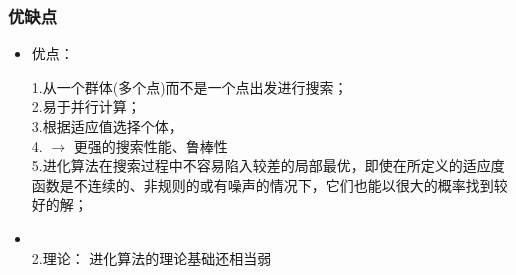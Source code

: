 \documentclass[handout]{beamer}
\begin{document}
		
		
		
		\begin{frame}
			\frametitle{优缺点}
			
			\begin{itemize}
				\item 优点：
				
				1.从一个群体(多个点)而不是一个点出发进行搜索；\\
				2.易于并行计算；\\
				3.根据适应值选择个体， \\
				4.  $\rightarrow$ 更强的搜索性能、鲁棒性\\
				5.进化算法在搜索过程中不容易陷入较差的局部最优，即使在所定义的适应度函数是不连续的、非规则的或有噪声的情况下，它们也能以很大的概率找到较好的解；
				
				
			\end{itemize}
			
	 
			
			\begin{itemize}
				\item {}
				 
				
				\\
				
				2.理论： 进化算法的理论基础还相当弱 
				
				
			\end{itemize}
			
		\end{frame}
		
		
%			
%				
%				
%				
%			
		
\end{document}

